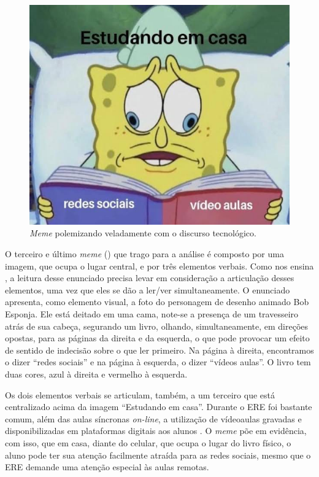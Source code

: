 \documentclass[portuguese]{textolivre}
\begin{document}
\begin{figure}[h!]
\centering
\begin{minipage}{.8\textwidth}
\includegraphics[width=\textwidth]{a46126Texto20do20artigo1489961706781120230920-img003.jpg}
\caption{\textit{Meme} polemizando veladamente com o discurso tecnológico.}
\label{fig:fig3}
\end{minipage}
\end{figure}
 
O terceiro e último \textit{meme} () que trago para a análise é composto por uma imagem, que ocupa o lugar central, e por três elementos verbais. Como nos ensina \textcite{brait2013olhar}, a leitura desse enunciado precisa levar em consideração a articulação desses elementos, uma vez que eles se dão a ler/ver simultaneamente. O enunciado apresenta, como elemento visual, a foto do personagem de desenho animado Bob Esponja. Ele está deitado em uma cama, note-se a presença de um travesseiro atrás de sua cabeça, segurando um livro, olhando, simultaneamente, em direções opostas, para as páginas da direita e da esquerda, o que pode provocar um efeito de sentido de indecisão sobre o que ler primeiro. Na página à direita, encontramos o dizer “redes sociais” e na página à esquerda, o dizer “vídeos aulas”. O livro tem duas cores, azul à direita e vermelho à esquerda.
	
Os dois elementos verbais se articulam, também, a um terceiro que está centralizado acima da imagem “Estudando em casa”. Durante o ERE foi bastante comum, além das aulas síncronas \textit{on-line}, a utilização de vídeoaulas gravadas e disponibilizadas em plataformas digitais aos alunos \cite{bastos2021interacoes}. O \textit{meme} põe em evidência, com isso, que em casa, diante do celular, que ocupa o lugar do livro físico, o aluno pode ter sua atenção facilmente atraída para as redes sociais, mesmo que o ERE demande uma atenção especial às aulas remotas.
	
\end{document}

